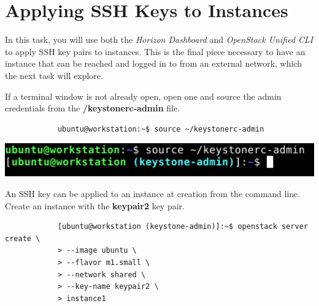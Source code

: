 \documentclass[letterpaper, 12pt]{article}
\begin{document}
\section{Applying SSH Keys to Instances}\label{sec:applying-ssh-keys-to-instances}
In this task, you will use both the \textit{Horizon Dashboard} and \textit{OpenStack Unified CLI} to apply SSH key pairs to instances.
This is the final piece necessary to have an instance that can be reached and logged in to from an external network, which the next task will explore.

\begin{enumerate}
    \begin{labstep}
        If a terminal window is not already open, open one and source the admin credentials from the \textbf{\texttildemid/keystonerc-admin} file.
        \begin{lstlisting}
            ubuntu@workstation:~$ source ~/keystonerc-admin
        \end{lstlisting}

        \begin{center}
            \includegraphics[width=\linewidth]{images/part8/step1.png}
        \end{center}
    \end{labstep}

    \begin{labstep}
        An SSH key can be applied to an instance at creation from the command line.
        Create an instance with the \textbf{keypair2} key pair.
        \begin{lstlisting}
            [ubuntu@workstation (keystone-admin)]:~$ openstack server create \
            > --image ubuntu \
            > --flavor m1.small \
            > --network shared \
            > --key-name keypair2 \
            > instance1
        \end{lstlisting}


\end{labstep}
\end{enumerate}
\end{document}
